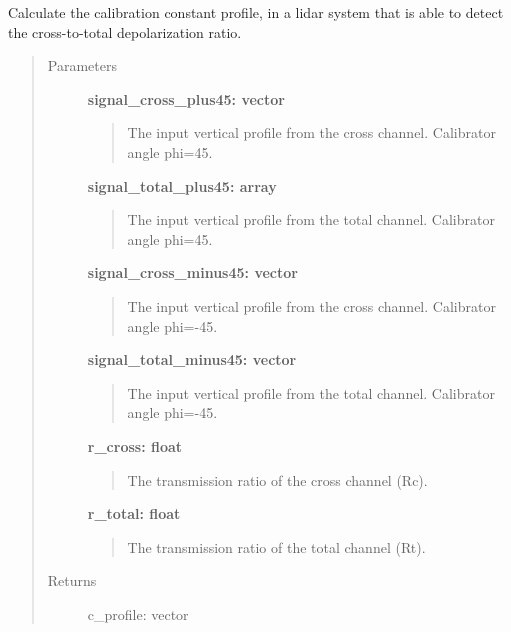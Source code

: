 \documentclass[letterpaper,10pt,english]{sphinxmanual}
\begin{document}
\begin{fulllineitems}
\label{depolarization:depolarization.calibration_constant_cross_total_profile}
Calculate the calibration constant profile, in a lidar system that is able
to detect the cross-to-total depolarization ratio.
\begin{quote}\begin{description}
\item[{Parameters}] \leavevmode
\textbf{signal\_cross\_plus45: vector}
\begin{quote}

The input vertical profile from the cross channel. Calibrator angle phi=45.
\end{quote}

\textbf{signal\_total\_plus45: array}
\begin{quote}

The input vertical profile from the total channel. Calibrator angle phi=45.
\end{quote}

\textbf{signal\_cross\_minus45: vector}
\begin{quote}

The input vertical profile from the cross channel. Calibrator angle phi=-45.
\end{quote}

\textbf{signal\_total\_minus45: vector}
\begin{quote}

The input vertical profile from the total channel. Calibrator angle phi=-45.
\end{quote}

\textbf{r\_cross: float}
\begin{quote}

The transmission ratio of the cross channel (Rc).
\end{quote}

\textbf{r\_total: float}
\begin{quote}

The transmission ratio of the total channel (Rt).
\end{quote}

\item[{Returns}] \leavevmode
c\_profile: vector
\begin{quote}


\end{quote}
\end{description}
\end{quote}
\end{fulllineitems}
\end{document}
